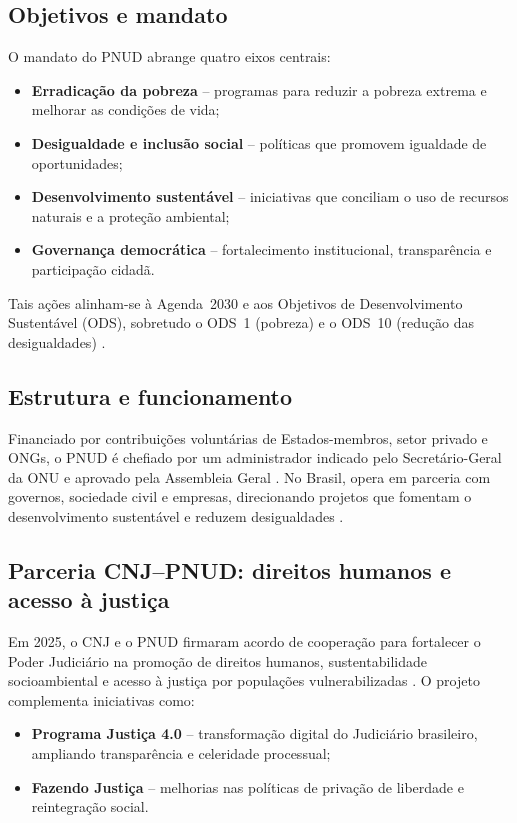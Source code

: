\subsection{Objetivos e mandato}
O mandato do PNUD abrange quatro eixos centrais:
\begin{itemize}
  \item \textbf{Erradicação da pobreza} – programas para reduzir a pobreza
  extrema e melhorar as condições de vida;
  \item \textbf{Desigualdade e inclusão social} – políticas que promovem
  igualdade de oportunidades;
  \item \textbf{Desenvolvimento sustentável} – iniciativas que conciliam o uso
  de recursos naturais e a proteção ambiental;
  \item \textbf{Governança democrática} – fortalecimento institucional,
  transparência e participação cidadã.
\end{itemize}
Tais ações alinham-se à Agenda~2030 e aos Objetivos de Desenvolvimento
Sustentável (ODS), sobretudo o ODS~1 (pobreza) e o ODS~10 (redução das
desigualdades) \cite{wikipedia2025pnud}.

\subsection{Estrutura e funcionamento}
Financiado por contribuições voluntárias de Estados-membros, setor privado e
ONGs, o PNUD é chefiado por um administrador indicado pelo Secretário-Geral da
ONU e aprovado pela Assembleia Geral \cite{undp2025onu}. No Brasil, opera em
parceria com governos, sociedade civil e empresas, direcionando projetos que
fomentam o desenvolvimento sustentável e reduzem desigualdades
\cite{undp2025sobre}.

\subsection{Parceria CNJ–PNUD: direitos humanos e acesso à justiça}
\label{sec:cnj-pnud}

Em 2025, o CNJ e o PNUD firmaram acordo de
cooperação para fortalecer o Poder Judiciário na promoção de direitos humanos,
sustentabilidade socioambiental e acesso à justiça por populações
vulnerabilizadas \cite{undp2025pnudcnj}. O projeto complementa iniciativas como:
\begin{itemize}
  \item \textbf{Programa Justiça 4.0} – transformação digital do Judiciário
        brasileiro, ampliando transparência e celeridade processual;
  \item \textbf{Fazendo Justiça} – melhorias nas políticas de privação de
        liberdade e reintegração social.
\end{itemize}

